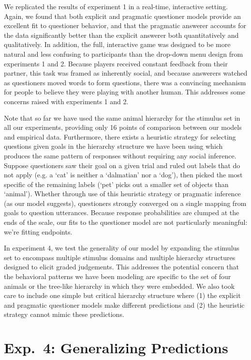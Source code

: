 \documentclass[12pt, floatsintext, man]{apa6}
\begin{document}
We replicated the results of experiment 1 in a real-time, interactive setting. Again, we found that both explicit and pragmatic questioner models provide an excellent fit to questioner behavior, and that the pragmatic answerer accounts for the data significantly better than the explicit answerer both quantitatively and qualitatively. In addition, the full, interactive game was designed to be more natural and less confusing to participants than the drop-down menu design from experiments 1 and 2. Because players received constant feedback from their partner, this task was framed as inherently social, and because answerers watched as questioners moved words to form questions, there was a convincing mechanism for people to believe they were playing with another human. This addresses some concerns raised with experiments 1 and 2. 

Note that so far we have used the same animal hierarchy for the stimulus set in all our experiments, providing only 16 points of comparison between our models and empirical data. Furthermore, there exists a heuristic strategy for selecting questions given goals in the hierarchy structure we have been using which produces the same pattern of responses without requiring any social inference. Suppose questioners saw their goal on a given trial and ruled out labels that do not apply (e.g. a `cat' is neither a `dalmatian' nor a `dog'), then picked the most specific of the remaining labels (`pet' picks out a smaller set of objects than `animal'). Whether through use of this heuristic strategy or pragmatic inference (as our model suggests), questioners strongly converged on a single mapping from goals to question utterances. Because response probabilities are clumped at the ends of the scale, our fits to the questioner model are not particularly meaningful: we're fitting endpoints.
 
In experiment 4, we test the generality of our model by expanding the stimulus set to encompass multiple stimulus domains and multiple hierarchy structures designed to elicit graded judgements. This addresses the potential concern that the behavioral patterns we have been modeling are specific to the set of four animals or the tree-like hierarchy in which they were embedded. We also took care to include one simple but critical hierarchy structure where (1) the explicit and pragmatic questioner models make different predictions and (2) the heuristic strategy cannot mimic these predictions. 

\section{Exp.~4: Generalizing Predictions}
\end{document}
